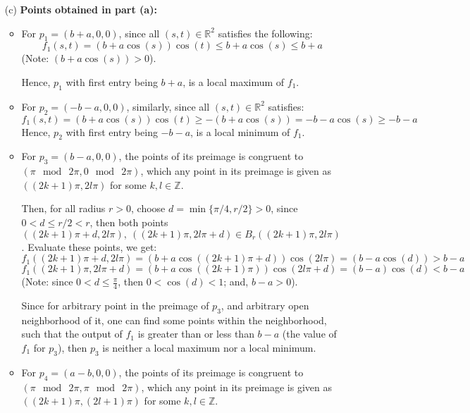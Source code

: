 \documentclass{article}
\begin{document}
\begin{itemize}
    \hfil

    \item[(c)] \textbf{Points obtained in part (a):}
    \begin{itemize}
        \item For $p_1=(b+a,0,0)$, since all $(s,t)\in\mathbb{R}^2$ satisfies the following:
        $$f_1(s,t)=(b+a\cos(s))\cos(t) \leq b+a\cos(s) \leq b+a$$
        (Note: $(b+a\cos(s))>0$).

        Hence, $p_1$ with first entry being $b+a$, is a local maximum of $f_1$.

        \hfil

        \item For $p_2=(-b-a,0,0)$, similarly, since all $(s,t)\in\mathbb{R}^2$ satisfies:
        $$f_1(s,t)=(b+a\cos(s))\cos(t) \geq -(b+a\cos(s)) = -b-a\cos(s) \geq -b-a$$
        Hence, $p_2$ with first entry being $-b-a$, is a local minimum of $f_1$.

        \hfil

        \item For $p_3 = (b-a,0,0)$, the points of its preimage is congruent to $(\pi\mod\ 2\pi, 0\mod\ 2\pi)$, 
        which any point in its preimage is given as $((2k+1)\pi, 2l\pi)$ for some $k,l\in\mathbb{Z}$.

        Then, for all radius $r>0$, choose $d=\min\{\pi/4, r/2\}>0$, since $0<d\leq r/2<r$, then both points $((2k+1)\pi+d, 2l\pi),\ ((2k+1)\pi, 2l\pi+d)\in B_r((2k+1)\pi, 2l\pi)$.
        Evaluate these points, we get:
        $$f_1((2k+1)\pi+d, 2l\pi) =(b+a\cos((2k+1)\pi+d))\cos(2l\pi) = (b-a\cos(d)) > b-a$$
        $$f_1((2k+1)\pi, 2l\pi+d)=(b+a\cos((2k+1)\pi))\cos(2l\pi +d) = (b-a)\cos(d) < b-a$$
        (Note: since $0<d\leq \frac{\pi}{4}$, then $ 0<\cos(d)<1$; and, $b-a>0$).

        Since for arbitrary point in the preimage of $p_3$, and arbitrary open neighborhood of it, one can find some points within the neighborhood, such that the output of $f_1$ is greater than or less than $b-a$ (the value of $f_1$ for $p_3$),
        then $p_3$ is neither a local maximum nor a local minimum.

        \hfil

        \item For $p_4=(a-b,0,0)$, the points of its preimage is congruent to $(\pi\mod\ 2\pi, \pi\mod\ 2\pi)$, 
        which any point in its preimage is given as $((2k+1)\pi, (2l+1)\pi)$ for some $k,l\in\mathbb{Z}$.


\end{itemize}
\end{itemize}
\end{document}
